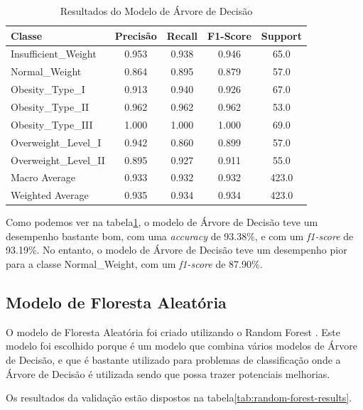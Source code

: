 \documentclass{easychair}
\begin{document}
\begin{table}[hbt!]
  \centering
  \begin{tabular}{l c c c c}
  \toprule
  Classe                 & Precisão & Recall & F1-Score & Support \\
  \midrule
  Insufficient\_Weight  & 0.953     & 0.938  & 0.946    & 65.0    \\
  Normal\_Weight        & 0.864     & 0.895  & 0.879    & 57.0    \\
  Obesity\_Type\_I      & 0.913     & 0.940  & 0.926    & 67.0    \\
  Obesity\_Type\_II     & 0.962     & 0.962  & 0.962    & 53.0    \\
  Obesity\_Type\_III    & 1.000     & 1.000  & 1.000    & 69.0    \\
  Overweight\_Level\_I  & 0.942     & 0.860  & 0.899    & 57.0    \\
  Overweight\_Level\_II & 0.895     & 0.927  & 0.911    & 55.0    \\
  \midrule
  Macro Average         & 0.933     & 0.932  & 0.932    & 423.0   \\
  Weighted Average      & 0.935     & 0.934  & 0.934    & 423.0   \\
  \bottomrule
  \end{tabular}
  \caption{Resultados do Modelo de Árvore de Decisão}
  \label{tab:decision-tree-results}
\end{table}

Como podemos ver na tabela\ref{tab:decision-tree-results}, o modelo de Árvore de Decisão teve um desempenho bastante bom, com uma \textit{accuracy} de 93.38\%, e com um \textit{f1-score} de 93.19\%. No entanto, o modelo de Árvore de Decisão teve um desempenho pior para a classe Normal\_Weight, com um \textit{f1-score} de 87.90\%.

\subsection{Modelo de Floresta Aleatória}

O modelo de Floresta Aleatória foi criado utilizando o Random Forest \cite{random-forest}. Este modelo foi escolhido porque é um modelo que combina vários modelos de Árvore de Decisão, e que é bastante utilizado para problemas de classificação onde a Árvore de Decisão é utilizada sendo que possa trazer potenciais melhorias.

Os resultados da validação estão dispostos na tabela\ref{tab:random-forest-results}.
\end{document}
